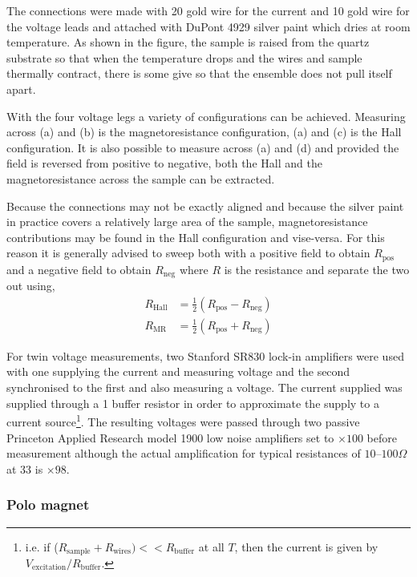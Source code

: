 The connections were made with \unit{20}{\micro\metre} gold wire for the current and \unit{10}{\micro\metre} gold wire for the voltage leads and attached with DuPont 4929 silver paint which dries at room temperature. As shown in the figure, the sample is raised from the quartz substrate so that when the temperature drops and the wires and sample thermally contract, there is some give so that the ensemble does not pull itself apart.

With the four voltage legs a variety of configurations can be achieved. Measuring across (a) and (b) is the magnetoresistance configuration, (a) and (c) is the Hall configuration. It is also possible to measure across (a) and (d) and provided the field is reversed from positive to negative, both the Hall and the magnetoresistance across the sample can be extracted.

Because the connections may not be exactly aligned and because the silver paint in practice covers a relatively large area of the sample, magnetoresistance contributions may be found in the Hall configuration and vise-versa. For this reason it is generally advised to sweep both with a positive field to obtain $R_{\textrm{pos}}$ and a negative field to obtain $R_{\textrm{neg}}$ where $R$ is the resistance and separate the two out using,
\begin{align}
R_{\textrm{Hall}} &= \frac{1}{2}( R_{\textrm{pos}} - R_{\textrm{neg}} ) \\
R_{\textrm{MR}} &= \frac{1}{2}( R_{\textrm{pos}} + R_{\textrm{neg}} )
\end{align}

For twin voltage measurements, two Stanford SR830 lock-in amplifiers were used with one supplying the current and measuring voltage and the second synchronised to the first and also measuring a voltage. The current supplied was supplied through a \unit{1}{\kilo\ohm} buffer resistor in order to approximate the supply to a current source\footnote{i.e. if ($R_{\textrm{sample}} + R_{\textrm{wires}}) << R_{\textrm{buffer}} $ at all $T$, then the current is given by $V_{\textrm{excitation}}/R_{\textrm{buffer}}$.}. The resulting voltages were passed through two passive Princeton Applied Research model 1900 low noise amplifiers set to $\times100$ before measurement although the actual amplification for typical resistances of $10$--$100\Omega$ at \unit{33}{\hertz} is $\times 98$.

\subsubsection{Polo magnet}

